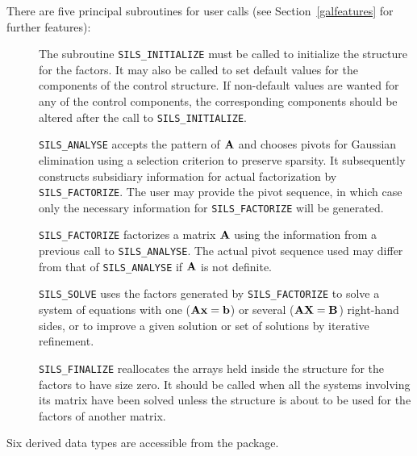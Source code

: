 \documentclass{galahad}
\newcommand{\packagename}{SILS}
\begin{document}
\noindent There are five principal subroutines for user calls (see
Section~\ref{galfeatures} for further features):

\begin{description}

\item[] The subroutine {\tt \packagename\_INITIALIZE} must be called to
initialize the
structure for the factors. It may also be called to set default values
for the components of the control structure. If non-default values are
wanted for any of the control components, the corresponding components
should be altered after the call to {\tt \packagename\_INITIALIZE}.

\item[] {\tt \packagename\_ANALYSE} accepts the pattern of ${\mathbf{A}}$
 and chooses  pivots
 for Gaussian elimination using a selection criterion to preserve
 sparsity.  It subsequently constructs subsidiary information for
 actual factorization by {\tt \packagename\_FACTORIZE}. The user may provide
 the pivot sequence, in which case only the necessary information for
 {\tt \packagename\_FACTORIZE} will be generated.

\item[] {\tt \packagename\_FACTORIZE} factorizes a matrix ${\mathbf{A}}$ using the
information
 from a previous call to {\tt \packagename\_ANALYSE}. The actual pivot sequence
 used may differ from that of {\tt \packagename\_ANALYSE} if ${\mathbf{A}}$ is not
definite.

\item[] {\tt \packagename\_SOLVE} uses the factors generated by
  {\tt \packagename\_FACTORIZE} to
  solve a system of equations with one (${\mathbf{A}} {\mathbf{x}} = {\mathbf{b}}$)
  or several (${\mathbf{A}} {\mathbf{X}} = {\mathbf{B}}$) right-hand sides,
  or to improve a given solution or set of solutions
  by iterative refinement.

\item[] {\tt \packagename\_FINALIZE} reallocates the arrays held inside the
  structure for the factors to have size zero. It should be called
  when all the systems involving its matrix have been solved unless
  the structure is about to be used for the factors of another matrix.

\end{description}



\galtypes
Six derived data types are accessible from the package.

\end{document}

